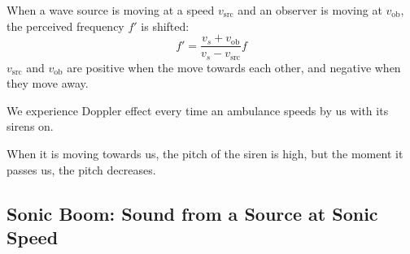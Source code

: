 %  
%
%
%
%

%
%
%
%
When a wave source is moving at a speed $v_\text{src}$ and an observer is
moving at $v_\text{ob}$, the perceived frequency $f'$ is shifted:
\begin{equation}
  \boxed{f'=\frac{v_s+v_\text{ob}}{v_s-v_\text{src}}f}
\end{equation}
$v_\text{src}$ and $v_\text{ob}$ are positive when the move towards each other,
and negative when they move away.

We experience Doppler effect every time an ambulance speeds by us with its
sirens on.
\begin{figure}[ht]
  \centering
\end{figure}
When it is moving towards us, the pitch of the siren is high, but the moment it
passes us, the pitch decreases.



\subsection{Sonic Boom: Sound from a Source at Sonic Speed}
\begin{figure}[ht]
  \centering
\end{figure}

